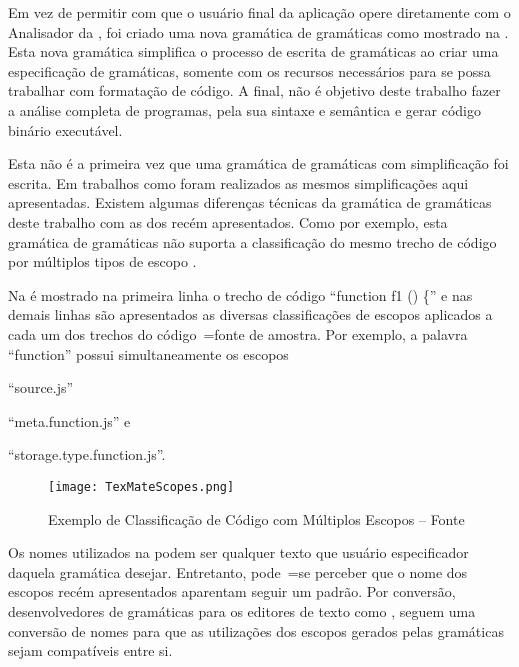 Em vez de permitir com que o usuário final da aplicação opere diretamente com o Analisador da ,
foi criado uma nova gramática de gramáticas como mostrado na .
Esta nova gramática simplifica o processo de escrita de gramáticas ao criar uma especificação de gramáticas,
somente com os recursos necessários para se possa trabalhar com formatação de código.
A final,
não é objetivo deste trabalho fazer a análise completa de programas,
pela sua sintaxe e
semântica e
gerar código binário executável.

Esta não é a primeira vez que uma gramática de gramáticas com simplificação foi escrita.
Em trabalhos como  foram realizados as mesmos simplificações aqui apresentadas.
Existem algumas diferenças técnicas da gramática de gramáticas deste trabalho com as dos recém apresentados.
Como por exemplo,
esta gramática de gramáticas não suporta a classificação do mesmo trecho de código por múltiplos tipos de escopo \cite{vsCodeSyntaxHighlighthing}.

Na  é mostrado na primeira linha o trecho de código ``function f1 () \{'' e
nas demais linhas são apresentados as diversas classificações de escopos aplicados a cada um dos trechos do código~=fonte de amostra.
Por exemplo, a palavra ``function'' possui simultaneamente os escopos
\begin{inparaenum}[1)]
\item ``source.js''
\item ``meta.function.js'' e
\item ``storage.type.function.js''.
\end{inparaenum}
\begin{figure}[h]
\centering
\texttt{[image: TexMateScopes.png]}
\caption[Exemplo de Classificação de Código com Múltiplos Escopos]{Exemplo de Classificação de Código com Múltiplos Escopos -- Fonte }
\label{TexMateScopes}
\end{figure}

Os nomes utilizados na  podem ser qualquer texto que usuário especificador daquela gramática desejar.
Entretanto,
pode~=se perceber que o nome dos escopos recém apresentados aparentam seguir um padrão.
Por conversão,
desenvolvedores de gramáticas para os editores de texto como ,
seguem uma conversão de nomes para que as utilizações dos escopos gerados pelas gramáticas sejam compatíveis entre si.

